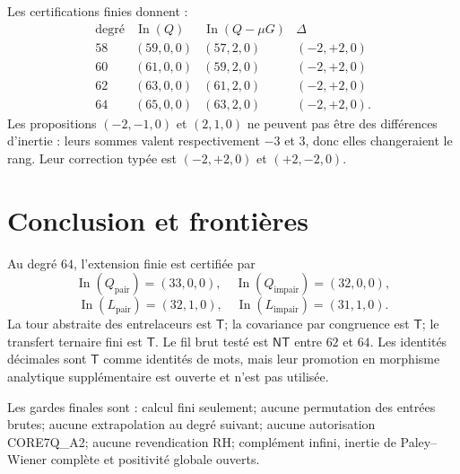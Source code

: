 \documentclass[11pt,a4paper]{article}
\theoremstyle{definition}
\newcommand{\In}{\operatorname{In}}
\newcommand{\T}{\mathsf{T}}
\newcommand{\NT}{\mathsf{NT}}
\begin{document}
Les certifications finies donnent :
\[
\begin{array}{c|c|c|c}
\text{degré}&\In(Q)&\In(Q-\mu G)&\Delta\\
\hline
58&(59,0,0)&(57,2,0)&(-2,+2,0)\\
60&(61,0,0)&(59,2,0)&(-2,+2,0)\\
62&(63,0,0)&(61,2,0)&(-2,+2,0)\\
64&(65,0,0)&(63,2,0)&(-2,+2,0).
\end{array}
\]
Les propositions $(-2,-1,0)$ et $(2,1,0)$ ne peuvent pas être des différences
d'inertie : leurs sommes valent respectivement $-3$ et $3$, donc elles changeraient
le rang. Leur correction typée est $(-2,+2,0)$ et $(+2,-2,0)$.

\section{Conclusion et frontières}

Au degré $64$, l'extension finie est certifiée par
\[
\In(Q_{\mathrm{pair}})=(33,0,0),\quad
\In(Q_{\mathrm{impair}})=(32,0,0),
\]
\[
\In(L_{\mathrm{pair}})=(32,1,0),\quad
\In(L_{\mathrm{impair}})=(31,1,0).
\]
La tour abstraite des entrelaceurs est $\T$; la covariance par congruence est $\T$;
le transfert ternaire fini est $\T$. Le fil brut testé est $\NT$ entre $62$ et $64$.
Les identités décimales sont $\T$ comme identités de mots, mais leur promotion en
morphisme analytique supplémentaire est ouverte et n'est pas utilisée.

Les gardes finales sont : calcul fini seulement; aucune permutation des entrées brutes;
aucune extrapolation au degré suivant; aucune autorisation CORE7Q\_A2; aucune
revendication RH; complément infini, inertie de Paley--Wiener complète et positivité
globale ouverts.
\end{document}

